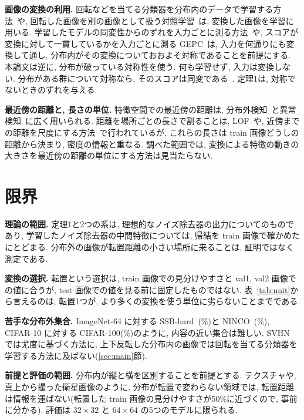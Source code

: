 \documentclass[MIRU,submit]{miru2025j}
\begin{document}
\textbf{画像の変換の利用.} 回転などを当てる分類器を分布内のデータで学習する方法~\cite{golan2018geometric,hendrycks2019ss}や, 回転した画像を別の画像として扱う対照学習~\cite{tack2020csi}は, 変換した画像を学習に用いる. 学習したモデルの同変性からのずれを入力ごとに測る方法~\cite{kaur2022idecode}や, スコアが変換に対して一貫しているかを入力ごとに測る GEPC~\cite{alexis2026gepc}は, 入力を何通りにも変換して通し, 分布内がその変換についておおよそ対称であることを前提にする. 本論文は逆に, 分布が破っている対称性を使う. 何も学習せず, 入力は変換しない. 分布がある群について対称なら, そのスコアは同変である~\cite{lu2025group,hoogeboom2022e3}. 定理1は, 対称でないときのずれを与える.

\textbf{最近傍の距離と, 長さの単位.} 特徴空間での最近傍の距離は, 分布外検知~\cite{sun2022knn}と異常検知~\cite{bergman2020dn2}に広く用いられる. 距離を場所ごとの長さで割ることは, LOF~\cite{breunig2000lof}や, 近傍までの距離を尺度にする方法~\cite{zelnik2004self}で行われているが, これらの長さは train 画像どうしの距離から決まり, 密度の情報と重なる. 調べた範囲では, 変換による特徴の動きの大きさを最近傍の距離の単位にする方法は見当たらない.

\section{限界}
\label{sec:limits}
\textbf{理論の範囲.} 定理1と2つの系は, 理想的なノイズ除去器の出力についてのものであり, 学習したノイズ除去器の中間特徴については, 帰結を train 画像で確かめたにとどまる. 分布外の画像が転置距離の小さい場所に来ることは, 証明ではなく測定である.

\textbf{変換の選択.} 転置という選択は, train 画像での見分けやすさと val1, val2 画像での値に合うが, test 画像での値を見る前に固定したものではない. 表~\ref{tab:unit}から言えるのは, 転置1つが, より多くの変換を使う単位に劣らないことまでである.

\textbf{苦手な分布外集合.} ImageNet-64 に対する SSB-hard~\cite{vaze2022openset}(\nPairSsbT\%)と NINCO~\cite{bitterwolf2023ninco}(\nPairNincoT\%), CIFAR-10 に対する CIFAR-100(\nPairCHundT\%)のように, 内容の近い集合は難しい. SVHN では尤度に基づく方法に, 上下反転した分布内の画像では回転を当てる分類器を学習する方法に及ばない(\ref{sec:main}節).

\textbf{前提と評価の範囲.} 分布内が縦と横を区別することを前提とする. テクスチャや, 真上から撮った衛星画像のように, 分布が転置で変わらない領域では, 転置距離は情報を運ばない(転置した train 画像の見分けやすさが50\%に近づくので, 事前に分かる). 評価は $32{\times}32$ と $64{\times}64$ の5つのモデルに限られる.
\end{document}
